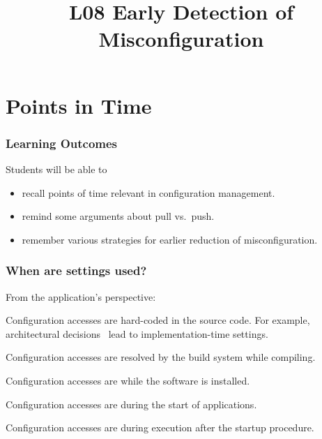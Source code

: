 


\title{L08 Early Detection of Misconfiguration}



\section{Points in Time}

\begin{frame}
	\frametitle{Learning Outcomes}
	Students will be able to
	\begin{itemize}
	\item recall points of time relevant in configuration management.
	\item remind some arguments about pull vs.\ push.
	\item remember various strategies for earlier reduction of misconfiguration.
	\end{itemize}
\end{frame}

\begin{frame}
\frametitle{When are settings used?}
	From the application's perspective:
	\vspace{1em}

	\begin{description}[<+-| alert@+>]
	\item[Implementation-time:] Configuration accesses 
	are hard-coded in the sou\-rce code.
	For example, architectural decisions~\cite{zdun2007patterns} lead to impl\-ementation-time settings.

	\item[Compile-time:] Configuration accesses 
	are resolved by the build system while compiling.

	\item[Deployment-time:] Configuration accesses 
	are while the software is installed.

	\item[Load-time:] Configuration accesses 
	are during the start of applications.

	\item[Run-time:] Configuration accesses 
	are during execution after the startup procedure.
	\end{description}
\end{frame}


